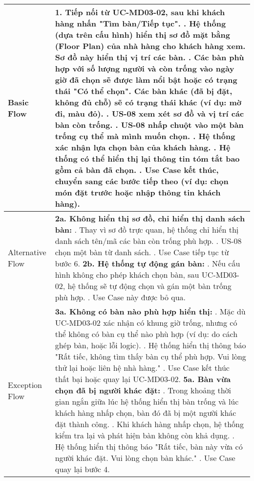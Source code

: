 \begin{longtable}{|m{4cm}|p{11cm}|}
Basic Flow & 1. Tiếp nối từ UC-MD03-02, sau khi khách hàng nhấn "Tìm bàn/Tiếp tục". \newline 2. Hệ thống (dựa trên cấu hình) hiển thị sơ đồ mặt bằng (Floor Plan) của nhà hàng cho khách hàng xem. Sơ đồ này hiển thị vị trí các bàn. \newline 3. Các bàn phù hợp với số lượng người và còn trống vào ngày giờ đã chọn sẽ được làm nổi bật hoặc có trạng thái "Có thể chọn". Các bàn khác (đã bị đặt, không đủ chỗ) sẽ có trạng thái khác (ví dụ: mờ đi, màu đỏ). \newline 4. US-08 xem xét sơ đồ và vị trí các bàn còn trống. \newline 5. US-08 nhấp chuột vào một bàn trống cụ thể mà mình muốn chọn. \newline 6. Hệ thống xác nhận lựa chọn bàn của khách hàng. \newline 7. Hệ thống có thể hiển thị lại thông tin tóm tắt bao gồm cả bàn đã chọn. \newline 8. Use Case kết thúc, chuyển sang các bước tiếp theo (ví dụ: chọn món đặt trước hoặc nhập thông tin khách hàng). \\
\hline
Alternative Flow & \textbf{2a. Không hiển thị sơ đồ, chỉ hiển thị danh sách bàn:} \newline    1. Thay vì sơ đồ trực quan, hệ thống chỉ hiển thị danh sách tên/mã các bàn còn trống phù hợp. \newline    2. US-08 chọn một bàn từ danh sách. \newline    3. Use Case tiếp tục từ bước 6. \newline \textbf{2b. Hệ thống tự động gán bàn:} \newline    1. Nếu cấu hình không cho phép khách chọn bàn, sau UC-MD03-02, hệ thống sẽ tự động chọn và gán một bàn trống phù hợp. \newline    2. Use Case này được bỏ qua. \\
\hline
Exception Flow & \textbf{3a. Không có bàn nào phù hợp hiển thị:} \newline    1. Mặc dù UC-MD03-02 xác nhận có khung giờ trống, nhưng có thể không có bàn cụ thể nào phù hợp (ví dụ: do cách ghép bàn, hoặc lỗi logic). \newline    2. Hệ thống hiển thị thông báo "Rất tiếc, không tìm thấy bàn cụ thể phù hợp. Vui lòng thử lại hoặc liên hệ nhà hàng." \newline    3. Use Case kết thúc thất bại hoặc quay lại UC-MD03-02. \newline \textbf{5a. Bàn vừa chọn đã bị người khác đặt:} \newline    1. Trong khoảng thời gian ngắn giữa lúc hệ thống hiển thị bàn trống và lúc khách hàng nhấp chọn, bàn đó đã bị một người khác đặt thành công. \newline    2. Khi khách hàng nhấp chọn, hệ thống kiểm tra lại và phát hiện bàn không còn khả dụng. \newline    3. Hệ thống hiển thị thông báo "Rất tiếc, bàn này vừa có người khác đặt. Vui lòng chọn bàn khác." \newline    4. Use Case quay lại bước 4. \\

\end{longtable}
